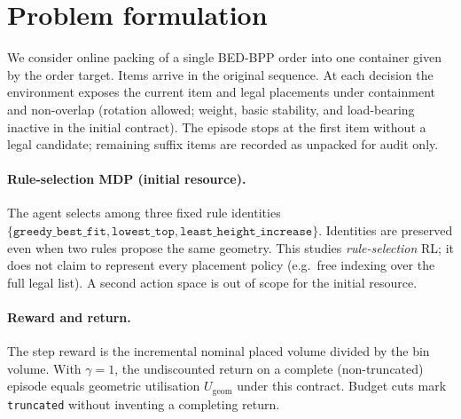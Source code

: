 \section{Problem formulation}

We consider online packing of a single BED-BPP order into one container given by
the order target. Items arrive in the original sequence. At each decision the
environment exposes the current item and legal placements under containment and
non-overlap (rotation allowed; weight, basic stability, and load-bearing
inactive in the initial contract). The episode stops at the first item without a
legal candidate; remaining suffix items are recorded as unpacked for audit only.

\paragraph{Rule-selection MDP (initial resource).}
The agent selects among three fixed rule identities
\(\{\texttt{greedy\_best\_fit},\texttt{lowest\_top},\texttt{least\_height\_increase}\}\).
Identities are preserved even when two rules propose the same geometry. This
studies \emph{rule-selection} RL; it does not claim to represent every placement
policy (e.g.\ free indexing over the full legal list). A second action space is
out of scope for the initial resource.

\paragraph{Reward and return.}
The step reward is the incremental nominal placed volume divided by the bin
volume. With \(\gamma=1\), the undiscounted return on a complete
(non-truncated) episode equals geometric utilisation
\(U_{\mathrm{geom}}\) under this contract. Budget cuts mark
\texttt{truncated} without inventing a completing return.
